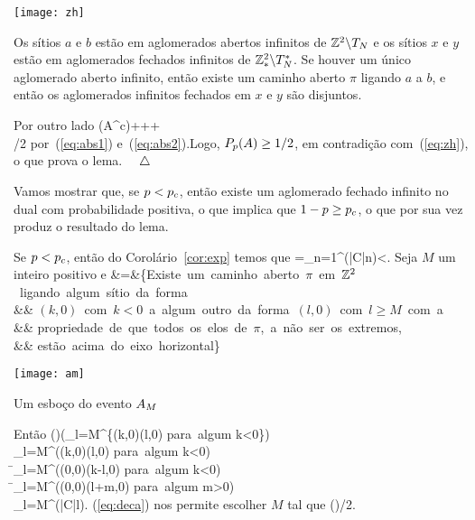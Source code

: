 \bef
%
\texttt{[image: zh]}
\caption{Os sítios $a$ e $b$ estão em aglomerados abertos infinitos de
  $\mathbb{Z}^2\backslash T_N$ e os sítios $x$ e $y$ estão em aglomerados fechados infinitos de
  $\mathbb{Z}^2_\ast\backslash T_N^\ast$. Se houver um único aglomerado aberto infinito,
  então existe um caminho aberto $\pi$ ligando $a$ a $b$, e então os
  aglomerados infinitos fechados em $x$ e $y$ são disjuntos.}
\label{fig:bid1}
\eef

Por outro lado
\beqnn
\ph(A^c)\le\ph[(\ane)^c]+\ph[(\adn)^c]+\ph[(\asnc)^c]+\ph[(\asnb)^c]\\
/2
\eeqnn
por~(\ref{eq:abs1}) e~(\ref{eq:abs2}).Logo, $P_p(A)\geq1/2$, em contradição com~(\ref{eq:zh}), o que prova o lema. $\quad\triangle$





\vs






Vamos mostrar que, se $p<p_c$, então existe um aglomerado fechado infinito no
dual com probabilidade positiva, o que implica que $1-p\geq p_c$, o que por
sua vez produz o resultado do lema.

Se $p<p_c$, então do Corolário~\ref{cor:exp} temos que
\beq
\label{eq:deca}
\xip=\sum_{n=1}^\infty\p(|C|\geq n)<\infty.
\eeq
Seja $M$ um inteiro positivo e
\beqnn
\am&\!\!=&\!\!\{\mbox{Existe um caminho aberto $\pi$ em $\zt$ ligando 
algum sítio da forma}\\
&&\,\,\mbox{$(k,0)$ com $k<0$ a algum outro da forma  $(l,0)$ com
$l\geq M$ com a}\\
&&\,\,\mbox{propriedade de que todos os elos de $\pi$, a não
ser os extremos,}\\
&&\,\,\mbox{estão acima do eixo horizontal}\}
\eeqnn

\bef
%
\texttt{[image: am]}
\caption{Um esboço do evento $A_M$}
\eef

Então
\beqnn
\p(\am)\le\p\left(\bigcup_{l=M}^\infty\{(k,0)\lr(l,0)\,\,\mbox{para
    algum}\,\,k<0\}\right)\\
\le\sum_{l=M}^\infty\p((k,0)\lr(l,0)\,\,\mbox{para algum}\,\,k<0)\\
\=\sum_{l=M}^\infty\p((0,0)\lr(k-l,0)\,\,\mbox{para algum}\,\,k<0)\\
\=\sum_{l=M}^\infty\p((0,0)\lr(l+m,0)\,\,\mbox{para algum}\,\,m>0)\\
\le\sum_{l=M}^\infty\p(|C|\geq l).
\eeqnn
(\ref{eq:deca}) nos permite escolher $M$ tal que
\beq
\p(\am)/2.
\eeq

